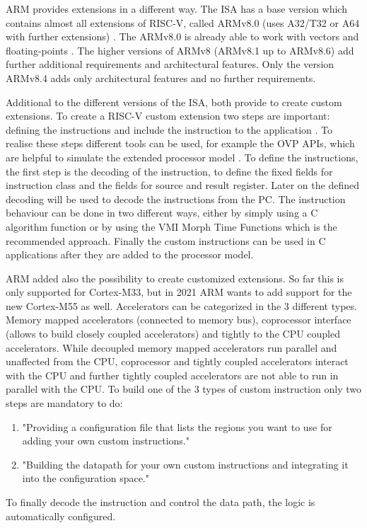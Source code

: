 \documentclass[conference]{IEEEtran}
\begin{document}
	ARM provides extensions in a different way. The \gls{ISA} has a base version which contains almost all extensions of RISC-V, called ARMv8.0 (uses A32/T32 or A64 with further extensions) \cite[page 60]{Arm2020}. The ARMv8.0 is already able to work with vectors and floating-points \cite[page 40- 50]{Arm2020}. The higher versions of ARMv8 (ARMv8.1 up to ARMv8.6) add further additional requirements and architectural features. Only the version ARMv8.4 adds only architectural features and no further requirements. \cite[page 60ff]{Arm2020}
	
	Additional to the different versions of the \gls{ISA}, both provide to create custom extensions.
	To create a RISC-V custom extension two steps are important: defining the instructions and include the instruction to the application \cite[page 16 - 21]{Limited2019}. To realise these steps different tools can be used, for example the OVP APIs, which are helpful to simulate the extended processor model \cite{Imperas}.
	To define the instructions, the first step is the decoding of the instruction, to define the fixed fields for instruction class and the fields for source and result register. Later on the defined decoding will be used to decode the instructions from the PC. The instruction behaviour can be done in two different ways, either by simply using a C algorithm function or by using the VMI Morph Time Functions which is the recommended approach. Finally the custom instructions can be used in C applications after they are added to the processor model. \cite[page 16 - 21]{Limited2019}
	
	ARM added also the possibility to create customized extensions. So far this is only supported for Cortex-M33, but in 2021 ARM wants to add support for the new Cortex-M55 as well. Accelerators can be categorized in the 3 different types. Memory mapped accelerators (connected to memory bus), coprocessor interface (allows to build closely coupled accelerators) and tightly to the CPU coupled accelerators. 
	While decoupled memory mapped accelerators run parallel and unaffected from the CPU, coprocessor and tightly coupled accelerators interact with the CPU and further tightly coupled accelerators are not able to run in parallel with the CPU. To build one of the 3 types of custom instruction only two steps are mandatory to do: 
	\begin{enumerate}
	\item "Providing a configuration file that lists the regions you want to use for adding your own custom instructions." \cite[page 4]{LauranneChoquin2020}
	\item "Building the datapath for your own custom instructions and integrating
	it into the configuration space." \cite[page 4]{LauranneChoquin2020}
	\end{enumerate}
	To finally decode the instruction and control the data path, the logic is automatically configured. \cite[page 2ff]{LauranneChoquin2020}
\end{document}
